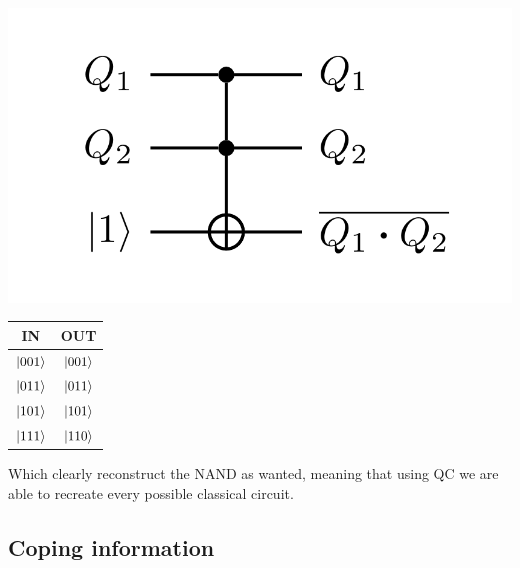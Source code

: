 \begin{minipage}{0.4\textwidth}
    \centering
    \includegraphics[width=\textwidth]{Immagini/NAND.pdf}
\end{minipage}
\begin{minipage}{0.45\textwidth}
    \centering
    \begin{tabular}{c|c}
        \textbf{IN} & \textbf{OUT}\\
        \midrule
        $\ket{001}$ & $\ket{001}$\\
        $\ket{011}$ & $\ket{011}$\\
        $\ket{101}$ & $\ket{101}$\\
        $\ket{111}$ & $\ket{110}$
    \end{tabular}
\end{minipage}

\noindent
Which clearly reconstruct the NAND as wanted, meaning that using QC we are able to recreate every possible classical circuit.

\subsection{Coping information}


